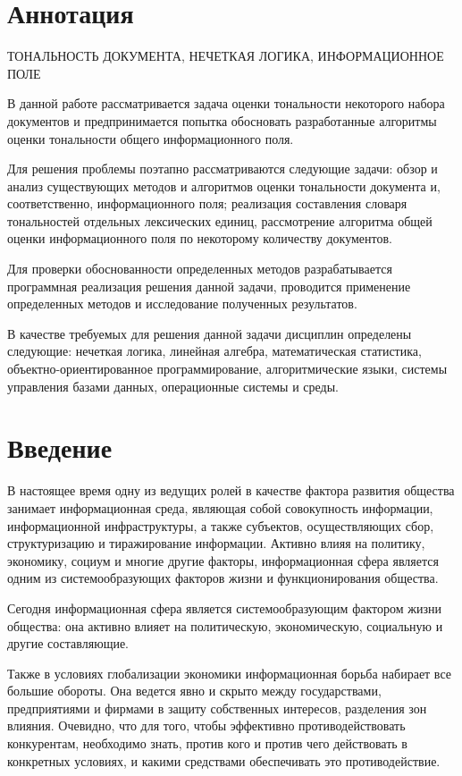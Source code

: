 \documentclass[a4paper,14pt,russian]{extreport}
\begin{document}
\chapter*{Аннотация}

ТОНАЛЬНОСТЬ ДОКУМЕНТА, НЕЧЕТКАЯ ЛОГИКА, ИНФОРМАЦИОННОЕ ПОЛЕ

В данной работе рассматривается задача оценки тональности некоторого набора документов и предпринимается попытка обосновать разработанные алгоритмы оценки тональности общего информационного поля.

Для решения проблемы поэтапно рассматриваются следующие задачи: обзор и анализ существующих методов и алгоритмов оценки тональности документа и, соответственно, информационного поля; реализация составления словаря тональностей отдельных лексических единиц, рассмотрение алгоритма общей оценки информационного поля по некоторому количеству документов.

Для проверки обоснованности определенных методов разрабатывается программная реализация решения данной задачи, проводится применение определенных методов и исследование полученных результатов.

В качестве требуемых для решения данной задачи дисциплин определены следующие: нечеткая логика, линейная алгебра, математическая статистика, объектно-ориентированное программирование, алгоритмические языки, системы управления базами данных, операционные системы и среды.
\newpage
\tableofcontents
\newpage
\chapter*{Введение}
В настоящее время одну из ведущих ролей в качестве фактора развития общества занимает информационная среда, являющая собой совокупность информации, информационной инфраструктуры, а также субъектов, осуществляющих сбор, структуризацию и тиражирование информации. Активно влияя на политику, экономику, социум и многие другие факторы, информационная сфера является одним из системообразующих факторов жизни и функционирования общества.

Сегодня информационная сфера является системообразующим фактором жизни общества: она активно влияет на политическую, экономическую, социальную и другие составляющие.

Также в условиях глобализации экономики информационная борьба набирает все большие обороты. Она ведется явно и скрыто между государствами, предприятиями и фирмами в защиту собственных интересов, разделения зон влияния. Очевидно, что для того, чтобы эффективно противодействовать конкурентам, необходимо знать, против кого и против чего действовать в конкретных условиях, и какими средствами обеспечивать это противодействие.
\end{document}
